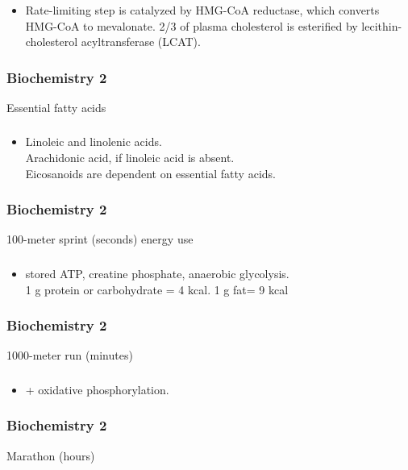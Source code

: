 \documentclass[11pt]{beamer}
\begin{document}
\begin{frame}
 \frametitle{}
\begin{itemize}
\item Rate-limiting step is catalyzed by HMG-CoA reductase, which converts HMG-CoA to mevalonate. 2/3 of plasma cholesterol is esterified by lecithin-cholesterol acyltransferase (LCAT).
\end{itemize}
\end{frame}

\begin{frame}
 \frametitle{Biochemistry 2}
Essential fatty acids
\end{frame}

\begin{frame}
 \frametitle{}
\begin{itemize}
\item Linoleic and linolenic acids. \\ Arachidonic acid, if linoleic acid is absent. \\ Eicosanoids are dependent on essential fatty acids.
\end{itemize}
\end{frame}

\begin{frame}
 \frametitle{Biochemistry 2}
100-meter sprint (seconds) energy use 
\end{frame}

\begin{frame}
 \frametitle{}
\begin{itemize}
\item stored ATP, creatine phosphate, anaerobic  glycolysis. \\ 1 g protein or carbohydrate = 4 kcal. 1 g fat= 9 kcal 
\end{itemize}
\end{frame}

\begin{frame}
 \frametitle{Biochemistry 2}
1000-meter run (minutes)
\end{frame}

\begin{frame}
 \frametitle{}
\begin{itemize}
\item + oxidative phosphorylation.
\end{itemize}
\end{frame}

\begin{frame}
 \frametitle{Biochemistry 2}
Marathon (hours)
\end{frame}
\end{document}
